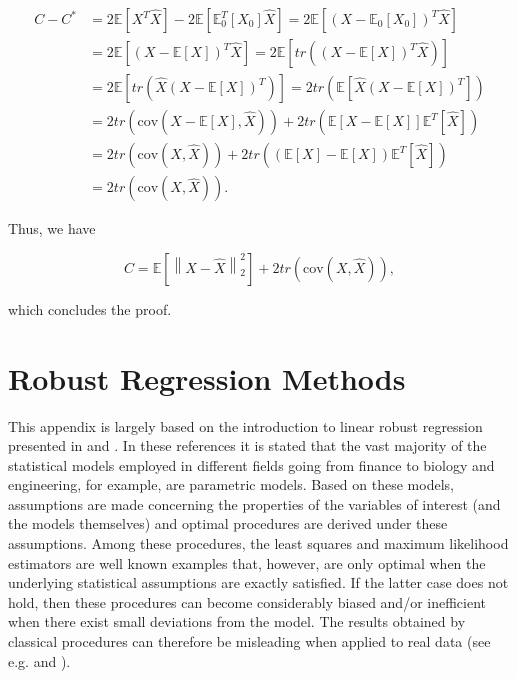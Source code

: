 \documentclass[]{book}
\theoremstyle{definition}
\theoremstyle{definition}
\theoremstyle{definition}
\theoremstyle{remark}
\begin{document}
\begin{align*}
  C - {C^*} &= 2 \mathbb{E}\left[  X^T \hat{X} \right] - 2 \mathbb{E}\left[ \mathbb{E}_0^T \left[X_0\right] \hat{X} \right] = 2 \mathbb{E}\left[ \left(X - \mathbb{E}_0 \left[X_0\right]\right)^T \hat{X} \right]\\
  &=2 \mathbb{E}\left[ \left(X - \mathbb{E} \left[X\right]\right)^T \hat{X} \right] = 2 \mathbb{E}\left[ tr \left(\left(X - \mathbb{E} \left[X\right]\right)^T \hat{X}\right) \right]\\
  &= 2 \mathbb{E}\left[ tr \left(\hat{X} \left(X - \mathbb{E} \left[X\right]\right)^T \right) \right] = 2 tr \left( \mathbb{E}\left[ \hat{X} \left(X - \mathbb{E} \left[X\right]\right)^T  \right] \right)\\
  &= 2 tr \left( \text{cov}\left( X - \mathbb{E} \left[X\right], \hat{X} \right)\right) + 2 tr \left( \mathbb{E}\left[ X - \mathbb{E} \left[X\right] \right] \mathbb{E}^T[\hat{X}]\right)\\
  &= 2 tr \left( \text{cov}\left( X, \hat{X} \right)\right) + 2 tr \left(\left( \mathbb{E}\left[ X \right] - \mathbb{E} \left[X\right] \right) \mathbb{E}^T[\hat{X}]\right)\\
  &= 2 tr \left( \text{cov}\left( X, \hat{X} \right)\right).
\end{align*}

Thus, we have

\begin{equation*}
C = \mathbb{E}\left[ {\left\| {X - \hat X} \right\|_2^2} \right] + 2 tr \left( \text{cov}\left( X, \hat{X} \right)\right),
\end{equation*}

which concludes the proof. \blacksquare

\chapter{Robust Regression Methods}\label{appendixb}

This appendix is largely based on the introduction to linear robust
regression presented in \citet{ronchetti2006historical} and
\citet{duncan2016ela}. In these references it is stated that the vast
majority of the statistical models employed in different fields going
from finance to biology and engineering, for example, are parametric
models. Based on these models, assumptions are made concerning the
properties of the variables of interest (and the models themselves) and
optimal procedures are derived under these assumptions. Among these
procedures, the least squares and maximum likelihood estimators are well
known examples that, however, are only optimal when the underlying
statistical assumptions are exactly satisfied. If the latter case does
not hold, then these procedures can become considerably biased and/or
inefficient when there exist small deviations from the model. The
results obtained by classical procedures can therefore be misleading
when applied to real data (see e.g. \citet{ronchetti2006historical} and
\citet{huber2009robust}).
\end{document}
